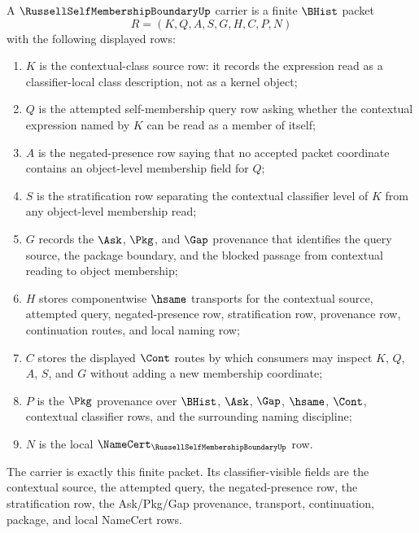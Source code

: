 \begin{definition}
\label{def:russell-self-membership-boundary-carrier}
A $\RussellSelfMembershipBoundaryUp$ carrier is a finite $\BHist$ packet
$$
R=(K,Q,A,S,G,H,C,P,N)
$$
with the following displayed rows:
\begin{enumerate}
\item $K$ is the contextual-class source row: it records the expression read as a classifier-local class description, not as a kernel object;
\item $Q$ is the attempted self-membership query row asking whether the contextual expression named by $K$ can be read as a member of itself;
\item $A$ is the negated-presence row saying that no accepted packet coordinate contains an object-level membership field for $Q$;
\item $S$ is the stratification row separating the contextual classifier level of $K$ from any object-level membership read;
\item $G$ records the $\Ask$, $\Pkg$, and $\Gap$ provenance that identifies the query source, the package boundary, and the blocked passage from contextual reading to object membership;
\item $H$ stores componentwise $\hsame$ transports for the contextual source, attempted query, negated-presence row, stratification row, provenance row, continuation routes, and local naming row;
\item $C$ stores the displayed $\Cont$ routes by which consumers may inspect $K$, $Q$, $A$, $S$, and $G$ without adding a new membership coordinate;
\item $P$ is the $\Pkg$ provenance over $\BHist$, $\Ask$, $\Gap$, $\hsame$, $\Cont$, contextual classifier rows, and the surrounding naming discipline;
\item $N$ is the local $\NameCert_{\RussellSelfMembershipBoundaryUp}$ row.
\end{enumerate}
The carrier is exactly this finite packet. Its classifier-visible fields are the contextual source, the attempted query, the negated-presence row, the stratification row, the Ask/Pkg/Gap provenance, transport, continuation, package, and local NameCert rows.
\end{definition}

